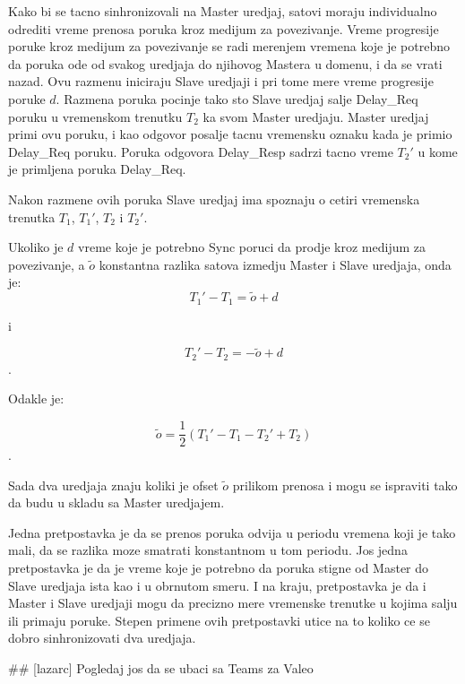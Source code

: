 \documentclass[a4paper,12pt, master]{etf}
\begin{document}
	Kako bi se tacno sinhronizovali na Master uredjaj, satovi moraju individualno odrediti 
	vreme prenosa poruka kroz medijum za povezivanje. Vreme progresije poruke kroz medijum za 
	povezivanje	se radi merenjem vremena koje je potrebno da poruka ode od svakog uredjaja do 
	njihovog Mastera u domenu, i da se vrati nazad. Ovu razmenu iniciraju Slave uredjaji i pri 
	tome mere vreme	progresije poruke $d$. Razmena poruka pocinje tako sto Slave uredjaj salje 
	Delay\_Req poruku u	vremenskom trenutku $T_2$ ka svom Master uredjaju. Master uredjaj 
	primi ovu poruku, i kao	odgovor posalje tacnu vremensku oznaku kada je primio Delay\_Req 
	poruku. Poruka odgovora	Delay\_Resp sadrzi tacno vreme $T_2'$ u kome je primljena poruka 
	Delay\_Req.

	Nakon razmene ovih poruka Slave uredjaj ima spoznaju o cetiri vremenska trenutka $T_1$, 
	$T_1'$,	$T_2$ i $T_2'$.

	Ukoliko je $d$ vreme koje je potrebno Sync poruci da prodje kroz medijum za povezivanje, a 
	$\tilde{o}$	konstantna razlika satova izmedju Master i Slave uredjaja, onda je:
	\begin{equation}
		T_1' - T_1 = \tilde{o} + d
	\end{equation}

	i

	\begin{equation}
			T_2' - T_2 = -\tilde{o} + d
	\end{equation}.

	Odakle je:

	\begin{equation}
		\tilde{o}=\frac{1}{2}(T_1' - T_1 - T_2' + T_2)
	\end{equation}.

	Sada dva uredjaja znaju koliki je ofset $\tilde{o}$ prilikom prenosa i mogu se ispraviti 
	tako da budu u skladu sa Master uredjajem.

	Jedna pretpostavka je da se prenos poruka odvija u periodu vremena koji je tako mali, da se
	razlika moze smatrati konstantnom u tom periodu. Jos jedna pretpostavka je da je vreme 
	koje je	potrebno da poruka stigne od Master do Slave uredjaja ista kao i u obrnutom smeru. 
	I na kraju,	pretpostavka je da i Master i Slave uredjaji mogu da precizno mere vremenske 
	trenutke u kojima salju ili primaju poruke. Stepen primene ovih pretpostavki utice na to 
	koliko ce se dobro sinhronizovati dva uredjaja.

	\#\# [lazarc] Pogledaj jos da se ubaci sa Teams za Valeo
\end{document}
